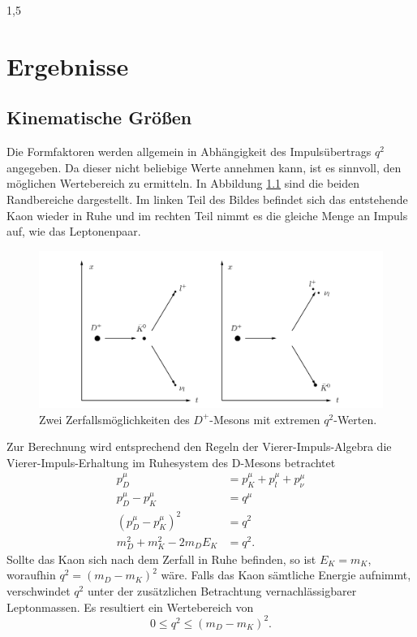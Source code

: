 \documentclass[11pt,a4paper,twoside]{report}
\begin{document}
\begin{spacing}{1,5}
\chapter{Ergebnisse}
\section{Kinematische Größen}
\vspace{-0.5cm}
Die Formfaktoren werden allgemein in Abhängigkeit des Impulsübertrags $q^2$ angegeben. Da dieser nicht beliebige Werte annehmen kann, ist es sinnvoll, den 
möglichen Wertebereich zu ermitteln.  In Abbildung \ref{pic_DZerfall} sind die beiden Randbereiche dargestellt. Im linken Teil des Bildes befindet sich das 
entstehende Kaon wieder in Ruhe und im rechten Teil nimmt es die gleiche Menge an Impuls auf, wie das Leptonenpaar.
\begin{figure}[H]
\includegraphics[width=1\textwidth]{Abbildungen/DZerfall.png}
\caption{Zwei Zerfallsmöglichkeiten des $D^+$-Mesons  mit extremen $q^2$-Werten.}
\label{pic_DZerfall}
\end{figure}
\noindent
Zur Berechnung wird entsprechend den Regeln der Vierer-Impuls-Algebra die Vierer-Impuls-Erhaltung im Ruhesystem des D-Mesons betrachtet
\begin{align}
 p_D^\mu &= p_K^\mu + p_l^\mu + p_\nu^\mu \nonumber\\
 p_D^\mu - p_K^\mu &= q^\mu\nonumber\\
 \left(p_D^\mu-p_K^\mu\right)^2 &= q^2 \nonumber\\
 m_D^2 + m_K^2 - 2m_DE_K &= q^2.
\end{align}
Sollte das Kaon sich nach dem Zerfall in Ruhe befinden, so ist $E_K = m_K$, woraufhin $q^2 = (m_D-m_K)^2$ wäre. Falls das Kaon sämtliche Energie aufnimmt,
verschwindet $q^2$ unter der zusätzlichen Betrachtung vernachlässigbarer Leptonmassen. Es resultiert ein Wertebereich von
\begin{equation}
 0 \leq q^2 \leq (m_D - m_K)^2.
\end{equation}




\end{spacing}
\end{document}
